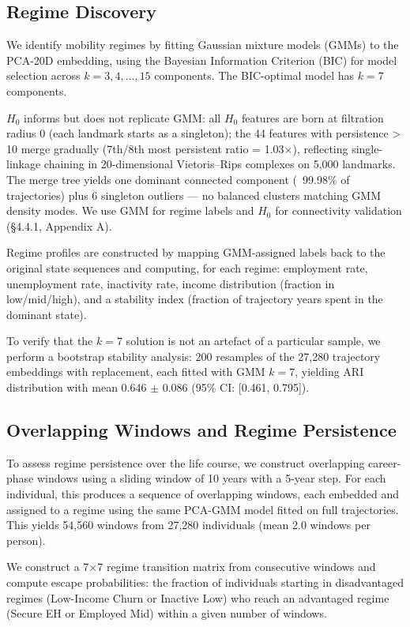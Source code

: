 \subsection{Regime Discovery}

We identify mobility regimes by fitting Gaussian mixture models (GMMs) to the PCA-20D embedding, using the Bayesian Information Criterion (BIC) for model selection across $k = 3, 4, \ldots, 15$ components. The BIC-optimal model has $k = 7$ components.

$H_0$ informs but does not replicate GMM: all $H_0$ features are born at filtration radius 0 (each landmark starts as a singleton); the 44 features with persistence > 10 merge gradually (7th/8th most persistent ratio = 1.03$\times$), reflecting single-linkage chaining in 20-dimensional Vietoris--Rips complexes on 5,000 landmarks. The merge tree yields one dominant connected component (~99.98\% of trajectories) plus 6 singleton outliers --- no balanced clusters matching GMM density modes. We use GMM for regime labels and $H_0$ for connectivity validation (\S4.4.1, Appendix A).

Regime profiles are constructed by mapping GMM-assigned labels back to the original state sequences and computing, for each regime: employment rate, unemployment rate, inactivity rate, income distribution (fraction in low/mid/high), and a stability index (fraction of trajectory years spent in the dominant state).

To verify that the $k = 7$ solution is not an artefact of a particular sample, we perform a bootstrap stability analysis: 200 resamples of the 27,280 trajectory embeddings with replacement, each fitted with GMM $k = 7$, yielding ARI distribution with mean 0.646 $\pm$ 0.086 (95\% CI: [0.461, 0.795]).

\subsection{Overlapping Windows and Regime Persistence}

To assess regime persistence over the life course, we construct overlapping career-phase windows using a sliding window of 10 years with a 5-year step. For each individual, this produces a sequence of overlapping windows, each embedded and assigned to a regime using the same PCA-GMM model fitted on full trajectories. This yields 54,560 windows from 27,280 individuals (mean 2.0 windows per person).

We construct a 7$\times$7 regime transition matrix from consecutive windows and compute escape probabilities: the fraction of individuals starting in disadvantaged regimes (Low-Income Churn or Inactive Low) who reach an advantaged regime (Secure EH or Employed Mid) within a given number of windows.

